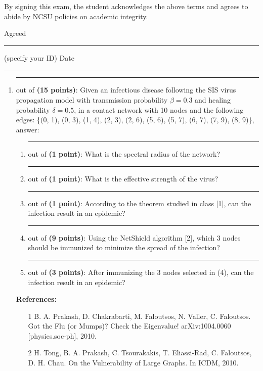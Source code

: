 \documentclass{article}%
\begin{document}
By signing this exam, the student acknowledges the above terms and agrees to abide by NCSU policies on academic integrity.

\bigskip
\noindent Agreed \rule{1in}{1pt} (specify your ID) \hspace{\fill} Date \rule{0.75in}{1pt}


\newpage
\begin{enumerate}

	\item \rule{0.5 in}{1 pt} out of \textbf{(15 points)}: Given an infectious disease following the SIS virus propagation model with transmission probability $\beta=0.3$ and healing probability $\delta=0.5$, in a contact network with 10 nodes and the following edges: \{(0, 1), (0, 3), (1, 4), (2, 3), (2, 6), (5, 6), (5, 7), (6, 7), (7, 9), (8, 9)\}, answer:
	\begin{enumerate}
	\item \rule{0.5 in}{1 pt} out of \textbf{(1 point)}: What is the spectral radius of the network?
	\item \rule{0.5 in}{1 pt} out of \textbf{(1 point)}: What is the effective strength of the virus?
	\item \rule{0.5 in}{1 pt} out of \textbf{(1 point)}: According to the theorem studied in class [1], can the infection result in an epidemic?
	\item \rule{0.5 in}{1 pt} out of \textbf{(9 points)}: Using the NetShield algorithm [2], which 3 nodes should be immunized to minimize the spread of the infection?
	\item \rule{0.5 in}{1 pt} out of \textbf{(3 points)}: After immunizing the 3 nodes selected in (4), can the infection result in an epidemic?
	\end{enumerate}
	
\textbf{References:}	
\begin{itemize}
	\item [1] B. A. Prakash, D. Chakrabarti, M. Faloutsos, N. Valler, C. Faloutsos. Got the Flu (or Mumps)? Check the Eigenvalue! arXiv:1004.0060 [physics.soc-ph], 2010.
	\item [2] H. Tong, B. A. Prakash, C. Tsourakakis, T. Eliassi-Rad, C. Faloutsos, D. H. Chau. On the Vulnerability of Large Graphs. In ICDM, 2010.
\end{itemize}



\end{enumerate}
\end{document}
